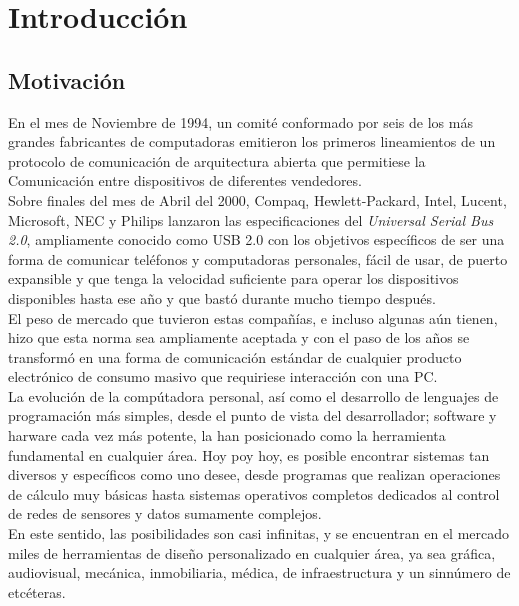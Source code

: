 \chapter{Introducción}
  \section{Motivación}

En el mes de Noviembre de 1994, un comité conformado por seis de los más grandes
fabricantes de computadoras emitieron los primeros lineamientos de un protocolo
de comunicación de arquitectura abierta que permitiese la Comunicación entre
dispositivos de diferentes vendedores.\\

Sobre finales del mes de Abril del 2000, Compaq, Hewlett-Packard, Intel, Lucent,
Microsoft, NEC y Philips lanzaron las especificaciones del {\it Universal Serial
Bus 2.0}, ampliamente conocido como USB 2.0 con los objetivos específicos de ser
una forma de comunicar teléfonos y computadoras personales, fácil de usar, de
puerto expansible y que tenga la velocidad suficiente para operar los
dispositivos disponibles hasta ese año y que bastó durante mucho tiempo
después.\\%

El peso de mercado que tuvieron estas compañías, e incluso algunas aún tienen,
hizo que esta norma sea ampliamente aceptada y con el paso de los años se
transformó en una forma de comunicación estándar de cualquier producto
electrónico de consumo masivo que requiriese interacción con una PC.\\


La evolución de la compútadora personal, así como el desarrollo de lenguajes de
programación más simples, desde el punto de vista del desarrollador; software y
harware cada vez más potente, la han posicionado como la herramienta fundamental
en cualquier área. Hoy poy hoy, es posible encontrar sistemas tan diversos y
específicos como uno desee, desde programas que realizan operaciones de cálculo
muy básicas hasta sistemas operativos completos dedicados al control de redes de
sensores y datos sumamente complejos.\\

En este sentido, las posibilidades son casi infinitas, y se encuentran en el
mercado miles de herramientas de diseño personalizado en cualquier área, ya sea
gráfica, audiovisual, mecánica, inmobiliaria, médica, de infraestructura y un
sinnúmero de etcéteras.\\


